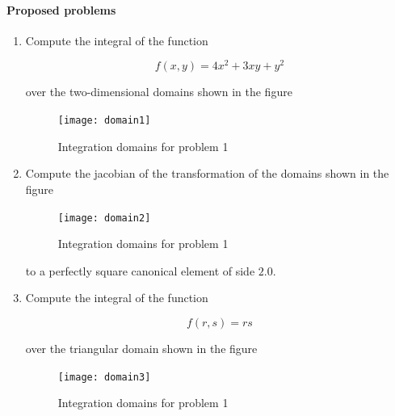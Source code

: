 \paragraph*{Proposed problems}
\begin{enumerate}

\item \label{punto01} Compute the integral of the function

\[f(x,y)=4x^2+3xy+y^2\]

over the two-dimensional domains shown in the figure

\begin{figure}[H]
\centering
\texttt{[image: domain1]}
\caption{Integration domains for problem 1}
\label{fig:intdomains}
\end{figure}

\item \label{punto02} Compute the jacobian of the transformation of the domains shown in the figure

\begin{figure}[H]
\centering
\texttt{[image: domain2]}
\caption{Integration domains for problem 1}
\label{fig:jacdomains}
\end{figure}

to a perfectly square canonical element of side $2.0$.

\item \label{punto03} Compute the integral of the function

\[f(r,s)=rs\]

over the triangular domain shown in the figure

\begin{figure}[H]
\centering
\texttt{[image: domain3]}
\caption{Integration domains for problem 1}
\label{fig:tridomains}
\end{figure}



\end{enumerate}
